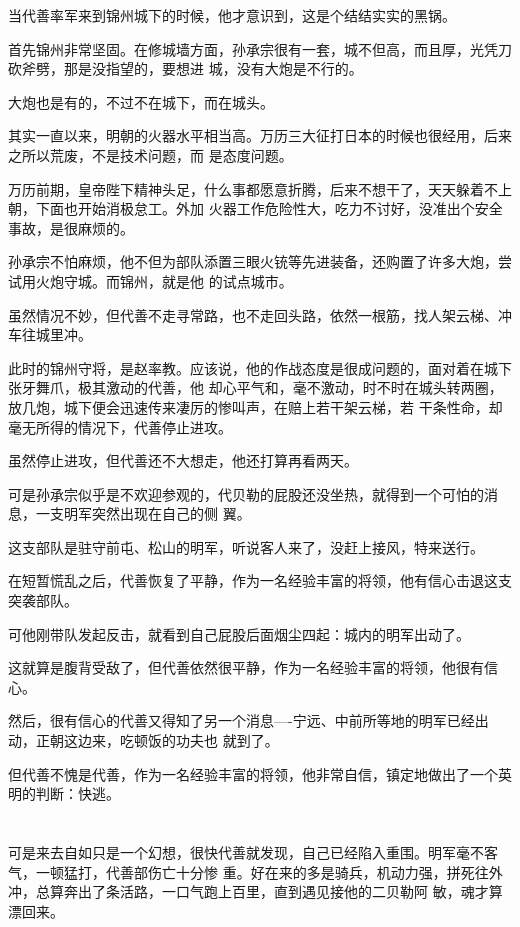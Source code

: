 \documentclass[11pt,a4paper,onecolumn]{article}
\begin{document}
当代善率军来到锦州城下的时候，他才意识到，这是个结结实实的黑锅。

首先锦州非常坚固。在修城墙方面，孙承宗很有一套，城不但高，而且厚，光凭刀砍斧劈，那是没指望的，要想进
城，没有大炮是不行的。

大炮也是有的，不过不在城下，而在城头。

其实一直以来，明朝的火器水平相当高。万历三大征打日本的时候也很经用，后来之所以荒废，不是技术问题，而
是态度问题。

万历前期，皇帝陛下精神头足，什么事都愿意折腾，后来不想干了，天天躲着不上朝，下面也开始消极怠工。外加
火器工作危险性大，吃力不讨好，没准出个安全事故，是很麻烦的。

孙承宗不怕麻烦，他不但为部队添置三眼火铳等先进装备，还购置了许多大炮，尝试用火炮守城。而锦州，就是他
的试点城市。

虽然情况不妙，但代善不走寻常路，也不走回头路，依然一根筋，找人架云梯、冲车往城里冲。

此时的锦州守将，是赵率教。应该说，他的作战态度是很成问题的，面对着在城下张牙舞爪，极其激动的代善，他
却心平气和，毫不激动，时不时在城头转两圈，放几炮，城下便会迅速传来凄厉的惨叫声，在赔上若干架云梯，若
干条性命，却毫无所得的情况下，代善停止进攻。

虽然停止进攻，但代善还不大想走，他还打算再看两天。

可是孙承宗似乎是不欢迎参观的，代贝勒的屁股还没坐热，就得到一个可怕的消息，一支明军突然出现在自己的侧
翼。

这支部队是驻守前屯、松山的明军，听说客人来了，没赶上接风，特来送行。

在短暂慌乱之后，代善恢复了平静，作为一名经验丰富的将领，他有信心击退这支突袭部队。

可他刚带队发起反击，就看到自己屁股后面烟尘四起：城内的明军出动了。

这就算是腹背受敌了，但代善依然很平静，作为一名经验丰富的将领，他很有信心。

然后，很有信心的代善又得知了另一个消息----宁远、中前所等地的明军已经出动，正朝这边来，吃顿饭的功夫也
就到了。

但代善不愧是代善，作为一名经验丰富的将领，他非常自信，镇定地做出了一个英明的判断：快逃。

\section[\thesection]{}

可是来去自如只是一个幻想，很快代善就发现，自己已经陷入重围。明军毫不客气，一顿猛打，代善部伤亡十分惨
重。好在来的多是骑兵，机动力强，拼死往外冲，总算奔出了条活路，一口气跑上百里，直到遇见接他的二贝勒阿
敏，魂才算漂回来。
\end{document}
